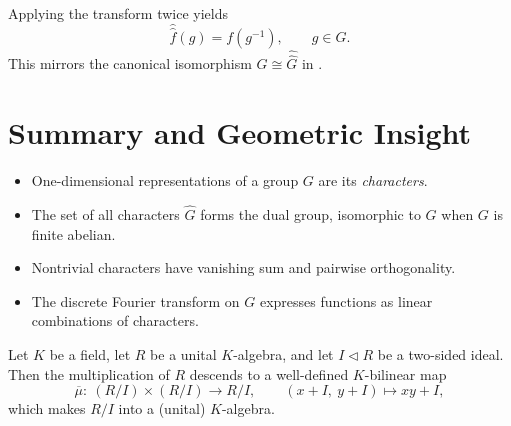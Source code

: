 \begin{corollary}
Applying the transform twice yields
\[
\widehat{\widehat{f}}(g) = f(g^{-1}), \qquad g\in G.
\]
This mirrors the canonical isomorphism $G\cong\widehat{\widehat{G}}$ in .
\end{corollary}

\section{Summary and Geometric Insight}

\begin{itemize}
    \item One-dimensional representations of a group $G$ are its \emph{characters}.
    \item The set of all characters $\widehat{G}$ forms the dual group, isomorphic to $G$ when $G$ is finite abelian.
    \item Nontrivial characters have vanishing sum and pairwise orthogonality.
    \item The discrete Fourier transform on $G$ expresses functions as linear combinations of characters.
\end{itemize}

\begin{center}
\end{center}

\begin{proposition}
Let $K$ be a field, let $R$ be a unital $K$-algebra, and let $I\lhd R$ be a two-sided ideal.
Then the multiplication of $R$ descends to a well-defined $K$-bilinear map
\[
\overline{\mu}:\ (R/I)\times(R/I)\longrightarrow R/I,\qquad
(x+I,\ y+I)\longmapsto xy+I,
\]
which makes $R/I$ into a (unital) $K$-algebra.
\end{proposition}

